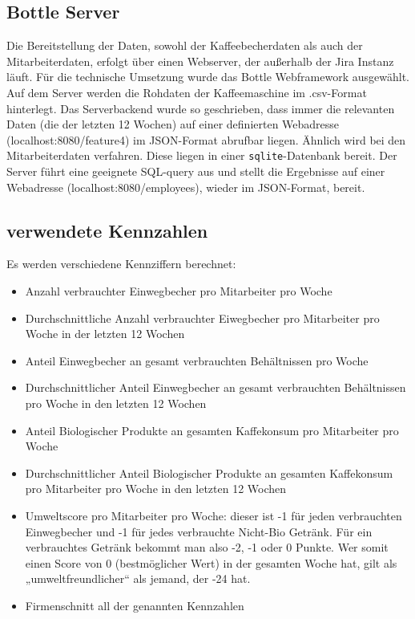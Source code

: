 \documentclass[a4paper,12pt,]{article}
\begin{document}
\subsection{Bottle Server}\label{Bottle}
Die Bereitstellung der Daten, sowohl der Kaffeebecherdaten als auch der Mitarbeiterdaten, erfolgt über einen Webserver, der außerhalb der Jira Instanz läuft. Für die technische Umsetzung wurde das Bottle Webframework ausgewählt. Auf dem Server werden die Rohdaten der Kaffeemaschine im .csv-Format hinterlegt. Das Serverbackend wurde so geschrieben, dass immer die relevanten Daten (die der letzten 12 Wochen) auf einer definierten Webadresse (localhost:8080/feature4) im JSON-Format abrufbar liegen. Ähnlich wird bei den Mitarbeiterdaten verfahren. Diese liegen in einer \texttt{sqlite}-Datenbank bereit. Der Server führt eine geeignete SQL-query aus und stellt die Ergebnisse auf einer Webadresse (localhost:8080/employees), wieder im JSON-Format, bereit.

\subsection{verwendete Kennzahlen}
Es werden verschiedene Kennziffern berechnet:
\begin{itemize}
	\item Anzahl verbrauchter Einwegbecher pro Mitarbeiter pro Woche
	\item Durchschnittliche Anzahl verbrauchter Eiwegbecher pro Mitarbeiter pro Woche in der letzten 12 Wochen
	\item Anteil Einwegbecher an gesamt verbrauchten Behältnissen pro Woche
	\item Durchschnittlicher Anteil Einwegbecher an gesamt verbrauchten Behältnissen pro Woche in den letzten 12 Wochen
	\item Anteil Biologischer Produkte an gesamten Kaffekonsum pro Mitarbeiter pro Woche
	\item Durchschnittlicher Anteil Biologischer Produkte an gesamten Kaffekonsum pro Mitarbeiter pro Woche in den letzten 12 Wochen
	\item Umweltscore pro Mitarbeiter pro Woche: dieser ist -1 für jeden verbrauchten Einwegbecher und -1 für jedes verbrauchte Nicht-Bio Getränk. Für ein verbrauchtes Getränk bekommt man also -2, -1 oder 0 Punkte. Wer somit einen Score von 0 (bestmöglicher Wert) in der gesamten Woche hat, gilt als „umweltfreundlicher“ als jemand, der -24 hat.
	\item Firmenschnitt all der genannten Kennzahlen
\end{itemize}
\end{document}
